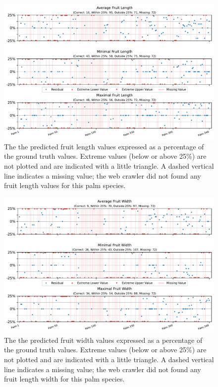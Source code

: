 \documentclass[a4paper, 12pt, oneside]{book} %
\begin{document}
\begin{figure}[htpb]
    \centering
    \includegraphics[width=1\textwidth]{figures/fruitlength_values.pdf}
    \caption[Fruit length values ground truth vs predicted]{The the predicted fruit length values expressed as a percentage of the ground truth values. Extreme values (below or above 25\%) are not plotted and are indicated with a little triangle. A dashed vertical line indicates a missing value; the web crawler did not found any fruit length values for this palm species.}
    \label{fig:fruitlength_values}
\end{figure}

\begin{figure}[htpb]
    \centering
    \includegraphics[width=1\textwidth]{figures/fruitwidth_values.pdf}
    \caption[Fruit width values ground truth vs predicted]{The the predicted fruit width values expressed as a percentage of the ground truth values. Extreme values (below or above 25\%) are not plotted and are indicated with a little triangle. A dashed vertical line indicates a missing value; the web crawler did not found any fruit length width for this palm species.}
    \label{fig:fruitwidth_values}
\end{figure}
\end{document}
